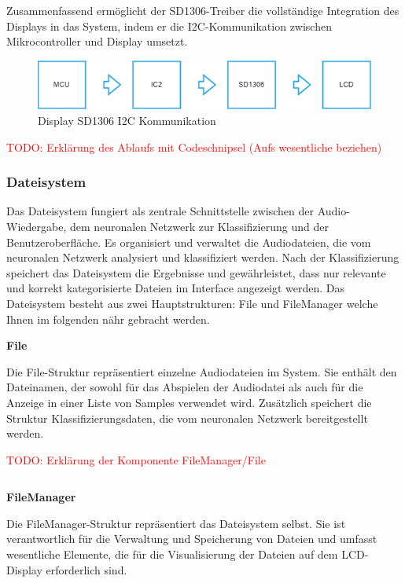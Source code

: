 Zusammenfassend ermöglicht der SD1306-Treiber die vollständige Integration des Displays in das System, indem er die I2C-Kommunikation zwischen Mikrocontroller und Display umsetzt.


\begin{figure}[H]
	\centering
	\includegraphics[width=1.0\textwidth]{images/08_durchfuehrung/interface/Display SD1306 Treiber I2C.drawio}
	\caption{Display SD1306 I2C Kommunikation}
	\label{fig:Display SD1306 I2C}
\end{figure}

\newpage

\textcolor{red}{TODO: Erklärung des Ablaufs mit Codeschnipsel (Aufs wesentliche beziehen)}

\subsubsection{Dateisystem}

Das Dateisystem fungiert als zentrale Schnittstelle zwischen der Audio-Wiedergabe, dem neuronalen Netzwerk zur Klassifizierung und der Benutzeroberfläche. Es organisiert und verwaltet die Audiodateien, die vom neuronalen Netzwerk analysiert und klassifiziert werden. Nach der Klassifizierung speichert das Dateisystem die Ergebnisse und gewährleistet, dass nur relevante und korrekt kategorisierte Dateien im Interface angezeigt werden. Das Dateisystem besteht aus zwei Hauptstrukturen: File und FileManager welche Ihnen im folgenden nähr gebracht werden.

\vspace{1em}
\textbf{File}
\vspace{1em}

Die File-Struktur repräsentiert einzelne Audiodateien im System. Sie enthält den Dateinamen, der sowohl für das Abspielen der Audiodatei als auch für die Anzeige in einer Liste von Samples verwendet wird. Zusätzlich speichert die Struktur Klassifizierungsdaten, die vom neuronalen Netzwerk bereitgestellt werden.

\textcolor{red}{TODO: Erklärung der Komponente FileManager/File}

 \inputminted[firstline=37, lastline=41]{c}{../../f401_display_encoder_fader_test/Core/Inc/filemanager.h}
 
\vspace{1em}
\textbf{FileManager}
\vspace{1em}

Die FileManager-Struktur repräsentiert das Dateisystem selbst. Sie ist verantwortlich für die Verwaltung und Speicherung von Dateien und umfasst wesentliche Elemente, die für die Visualisierung der Dateien auf dem LCD-Display erforderlich sind.
 
 \inputminted[firstline=49, lastline=58]{c}{../../f401_display_encoder_fader_test/Core/Inc/filemanager.h}



